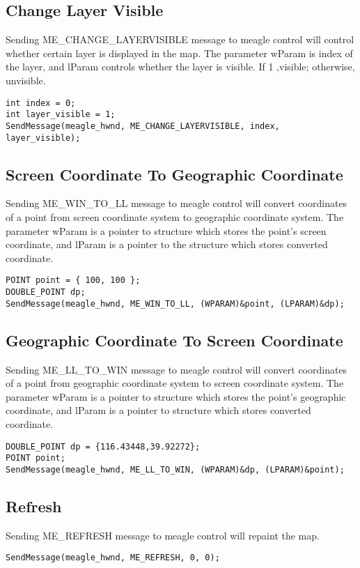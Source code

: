 \documentclass[a4paper]{article}
\begin{document}
\subsection{Change Layer Visible}
Sending ME\_CHANGE\_LAYERVISIBLE message to meagle control will control whether certain layer is displayed in the map.  The parameter wParam is index of the layer,  and lParam controls whether the layer is visible. If 1 ,visible; otherwise, unvisible.
\begin{lstlisting}
int index = 0;
int layer_visible = 1;
SendMessage(meagle_hwnd, ME_CHANGE_LAYERVISIBLE, index, layer_visible);
\end{lstlisting}


\subsection{Screen Coordinate To Geographic Coordinate}
Sending ME\_WIN\_TO\_LL message to meagle control will convert coordinates of a point from screen coordinate system to geographic coordinate system.  The parameter wParam is a pointer to structure which stores the point's screen coordinate, and lParam is a pointer to the structure which stores converted coordinate.
\begin{lstlisting}
POINT point = { 100, 100 };
DOUBLE_POINT dp;
SendMessage(meagle_hwnd, ME_WIN_TO_LL, (WPARAM)&point, (LPARAM)&dp);
\end{lstlisting}

\subsection{Geographic Coordinate  To Screen Coordinate}
Sending ME\_LL\_TO\_WIN message to meagle control will convert coordinates of a point from geographic coordinate system  to screen coordinate system.  The parameter wParam is a pointer to structure which stores the point's geographic coordinate, and lParam is a pointer to structure which stores converted coordinate.
\begin{lstlisting}
DOUBLE_POINT dp = {116.43448,39.92272};
POINT point;
SendMessage(meagle_hwnd, ME_LL_TO_WIN, (WPARAM)&dp, (LPARAM)&point);
\end{lstlisting}

\subsection{Refresh}
Sending ME\_REFRESH message to meagle control will repaint the map. 
\begin{lstlisting}
SendMessage(meagle_hwnd, ME_REFRESH, 0, 0);
\end{lstlisting}
\end{document}
